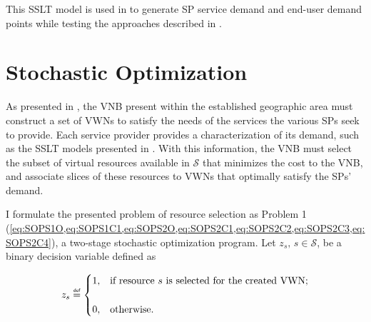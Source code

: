 \documentclass[12pt,dvipsnames]{report}
\newcommand\defeq{\mathrel{\overset{\makebox[0pt]{\mbox{\normalfont\tiny\sffamily def}}}{=}}}
\begin{document}
This SSLT model is used in  to generate SP service demand and end-user demand points while testing the approaches described in .

\section{Stochastic Optimization} \label{sec:stochopt}


As presented in , the VNB present within the established geographic area must construct a set of VWNs to satisfy the needs of the services the various SPs seek to provide.  Each service provider provides a characterization of its demand, such as the SSLT models presented in .  With this information, the VNB must select the subset of virtual resources available in $\mathcal{S}$ that minimizes the cost to the VNB, and associate slices of these resources to VWNs that optimally satisfy the SPs' demand.

I formulate the presented problem of resource selection as Problem 1 (\cref{eq:SOPS1O,eq:SOPS1C1,eq:SOPS2O,eq:SOPS2C1,eq:SOPS2C2,eq:SOPS2C3,eq:SOPS2C4}), a two-stage stochastic optimization program.  Let $z_s,\, s \in \mathcal{S}$, be a binary decision variable defined as

\iftrue %
\begin{singlespacing}
\begin{equation} \label{eq:z_s}
z_s \defeq
	\begin{cases}
		1,& \text{if resource $s$ is selected for the created VWN;}\\
		\\
		0,& \text{otherwise.}
	\end{cases}
\end{equation}
\end{singlespacing}
\else
\begin{equation} \label{eq:z_s}
z_s \defeq
	\begin{cases}
		1,& \text{if resource $s$ is selected for the created VWN;}\\
		0,& \text{otherwise,}
	\end{cases}
\end{equation}
\fi
\end{document}
